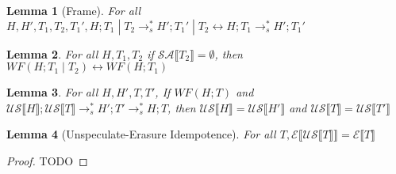 \documentclass[9pt]{article}
\newtheorem{lemma}{Lemma}
\newcommand\specStep{\rightarrow_{s}}
\newcommand{\erase}[1]{\mathcal{E}\llbracket #1 \rrbracket}
\newcommand{\unSpec}[1]{\mathcal{US} \llbracket #1 \rrbracket}
\newcommand{\specActions}[1]{\mathcal{SA} \llbracket #1 \rrbracket}
\begin{document}
\begin{lemma}[Frame]
\label{frame}
For all $H, H', T_1, T_2, T_1', H; T_1 \; | \; T_2 \specStep^* H'; T_1' \; | \; T_2 \leftrightarrow H; T_1 \specStep^* H'; T_1'$
\end{lemma}

\begin{lemma}
\label{wfFrame}
For all $H, T_1, T_2$ if $\specActions{T_2} = \emptyset$, then $WF(H; T_1 \; | \; T_2) \leftrightarrow WF(H; T_1)$
\end{lemma}

\begin{lemma}
\label{wfIntermediate}
For all $H, H', T, T'$, If $WF(H; T)$ and $\unSpec{H}; \unSpec{T} \specStep^* H'; T' \specStep^* H; T$, then $\unSpec{H} = \unSpec{H'}$ and $\unSpec{T} = \unSpec{T'}$
\end{lemma}

\begin{lemma}[Unspeculate-Erasure Idempotence]
\label{usEraseIdem}
For all $T, \erase{\unSpec{T}} = \erase{T}$

\end{lemma}

\begin{proof}
TODO
\end{proof}
\end{document}
